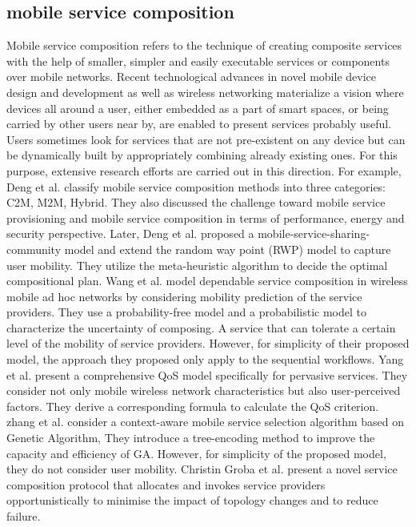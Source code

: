 \documentclass[10pt,journal,compsoc]{IEEEtran}
\begin{document}
\subsection{mobile service composition}
Mobile service composition refers to the technique of creating composite services with the help of smaller, simpler and easily executable services or components over mobile networks. Recent technological advances in novel mobile device design and development as well as wireless networking materialize a vision where devices all around a user, either embedded as a part of smart spaces, or being carried by other users
near by, are enabled to present services probably useful. Users sometimes look for services that are not pre-existent on any device but can be dynamically built by appropriately combining already existing ones. For this purpose, extensive research efforts are carried out in this direction. 
For example, Deng et al. \cite{Deng2016} classify mobile service composition methods into three categories: C2M, M2M, Hybrid. They also discussed the challenge toward mobile service provisioning and mobile service composition in terms of performance, energy and security perspective. 
Later, Deng et al. \cite{Deng2017} proposed a mobile-service-sharing-community model and extend the random way point (RWP) model to capture user mobility. They utilize the meta-heuristic algorithm to decide the optimal compositional plan. 
Wang et al. \cite{wang2011exploiting} model dependable service composition in wireless mobile ad hoc networks by considering mobility prediction of the service providers.
They use a probability-free model and a probabilistic model to characterize the uncertainty of composing. A service that can tolerate a certain level of the mobility of service providers. However, for simplicity of their proposed model, the approach they proposed only apply to the sequential workflows.
Yang et al. \cite{Yang2010} present a comprehensive QoS model specifically for pervasive services. They consider not only mobile wireless network characteristics but also user-perceived factors. They derive a corresponding formula to calculate the QoS criterion.
zhang et al. \cite{Zhang2016qos} consider a context-aware mobile service selection algorithm based on Genetic Algorithm, They introduce a tree-encoding method to improve the capacity and efficiency of GA. However, for simplicity of the proposed model, they do not consider user mobility.
Christin Groba et al. \cite{groba2014opportunistic} present a novel service composition protocol that allocates and invokes service providers opportunistically to minimise the impact of topology changes and to reduce failure.
\end{document}
